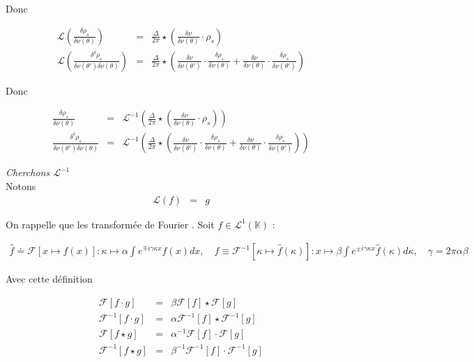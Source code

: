 Donc 

\begin{eqnarray*}
	\mathcal{L}\left (\frac{\delta \rho_s}{\delta \nu(\theta)}  \right ) & = &  \frac{\Delta}{2 \pi }  \star \left ( \frac{\delta \nu }{\delta \nu(\theta)}  \cdot \rho_s \right )	\\
	\mathcal{L}\left (\frac{\delta^\delta  \rho_s}{\delta \nu(\theta')\delta \nu(\theta)}  \right ) & = &  \frac{\Delta}{2 \pi }  \star \left ( \frac{\delta \nu }{\delta \nu(\theta')}  \cdot \frac{\delta \rho_s }{\delta \nu(\theta)} + \frac{\delta \nu }{\delta \nu(\theta)}  \cdot \frac{\delta \rho_s }{\delta \nu(\theta')} \right )
\end{eqnarray*}

Donc 

\begin{eqnarray*}
	\frac{\delta \rho_s}{\delta \nu(\theta)}  & = &  \mathcal{L}^{-1}\left (\frac{\Delta}{2 \pi }  \star \left ( \frac{\delta \nu }{\delta \nu(\theta)}  \cdot \rho_s \right ) \right )	\\
	\frac{\delta^\delta  \rho_s}{\delta \nu(\theta')\delta \nu(\theta)}  & = &  \mathcal{L}^{-1}\left (\frac{\Delta}{2 \pi }  \star \left ( \frac{\delta \nu }{\delta \nu(\theta')}  \cdot \frac{\delta \rho_s }{\delta \nu(\theta)} + \frac{\delta \nu }{\delta \nu(\theta)}  \cdot \frac{\delta \rho_s }{\delta \nu(\theta')} \right ) \right ) 
\end{eqnarray*}


{\em Cherchons  $\mathcal{L}^{-1}$ }\\



Notons 
\begin{eqnarray*}
	\mathcal{L} ( f ) & = & g 	
\end{eqnarray*}



On rappelle que les transformée de Fourier . Soit $f \in \mathcal{L}^1 ( \mathbb{K}) $ :

\begin{eqnarray*}
	\hat{f} \doteq \mathcal{F} [ x \mapsto f(x) ] \colon \kappa  \mapsto \alpha \int e^{ \mp i \gamma \kappa x } f(x) d x, \quad f \equiv \mathcal{F}^{-1} [ \kappa \mapsto \hat{f}(\kappa) ] \colon x \mapsto \beta \int e^{\pm i \gamma \kappa x } \hat{f}(\kappa) d \kappa, \quad \gamma = 2 \pi \alpha \beta 
\end{eqnarray*}

Avec cette définition 

\begin{eqnarray*}
	\mathcal{F} [f \cdot g  ] & = & \beta \mathcal{F} [f] \star \mathcal{F} [g]\\
	\mathcal{F}^{-1} [f \cdot g  ] & = & \alpha \mathcal{F}^{-1} [f] \star \mathcal{F}^{-1} [g]	\\
	\mathcal{F} [f \star g  ] & = & \alpha^{-1} 	\mathcal{F} [f] \cdot \mathcal{F} [g]\\
	\mathcal{F}^{-1} [f \star g  ] & = & \beta^{-1} 	\mathcal{F}^{-1} [f] \cdot \mathcal{F}^{-1} [g]
\end{eqnarray*}

